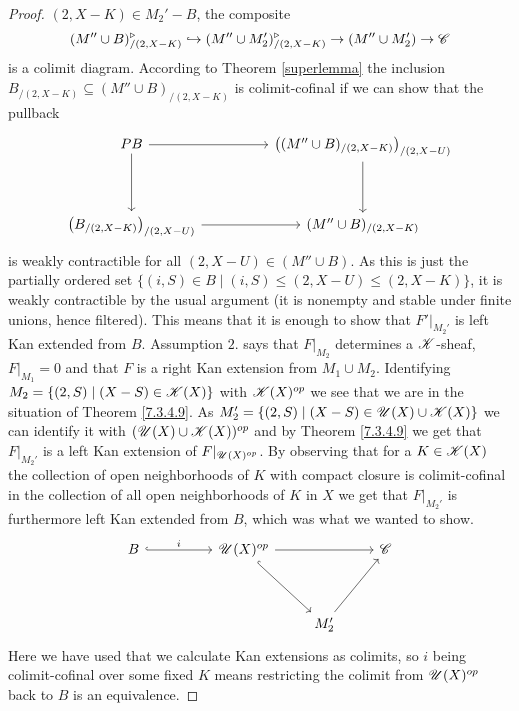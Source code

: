 \documentclass[../../thesis.tex]{subfiles}
\begin{document}
\begin{proof}
    $(2,X-K)\in M_2' - B$, the composite
    \[
        (M'' \cup B)^{\triangleright}_{/(2,X-K)} \hookrightarrow  (M'' \cup M_2')^{\triangleright}_{/(2,X-K)} \to (M''\cup M_2') \to \mathscr{C}
    \]
    is a colimit diagram.
    According to Theorem \ref{superlemma} the inclusion $B_{/(2,X-K)}\subseteq (M''\cup B)_{/(2,X-K)}$ is colimit-cofinal if we can show that the pullback
    \[\begin{tikzcd}
            PB && {\left((M''\cup B)_{/(2,X-K)}\right)_{/(2,X-U)}} \\
            \\
            {\left(B_{/(2,X-K)}\right)_{/(2,X-U)}} && {(M''\cup B)_{/(2,X-K)}}
            \arrow[from=1-1, to=1-3]
            \arrow[from=1-3, to=3-3]
            \arrow[from=3-1, to=3-3]
            \arrow[from=1-1, to=3-1]
        \end{tikzcd}\]
    is weakly contractible for all $(2,X-U) \in (M''\cup B)$.
    As this is just the partially ordered set $\{(i,S)\in B \mid (i,S) \leq (2,X-U) \leq (2,X-K)\}$, it is weakly contractible by the usual argument (it is nonempty and stable under finite unions, hence filtered).
    This means that it is enough to show that $F'|_{M_2'}$ is left Kan extended from $B$.
    Assumption $2.$ says that $F|_{M_2}$ determines a $\mathscr{K}$-sheaf, $F|_{M_1}=0$ and that $F$ is a right Kan extension from $M_1 \cup M_2$.
    Identifying $M_2 = \{(2, S) \mid (X-S) \in \mathscr{K}(X)\}$ with $\mathscr{K}(X)^{op}$ we see that we are in the situation of Theorem \ref{7.3.4.9}.
    As $M_2' = \{(2,S) \mid (X-S) \in \mathscr{U}(X) \cup \mathscr{K}(X)\}$ we can identify it with $(\mathscr{U}(X) \cup \mathscr{K}(X))^{op}$ and by Theorem \ref{7.3.4.9} we get that $F|_{M_2'}$ is a left Kan extension of $F|_{\mathscr{U}(X)^{op}}$.
    By observing that for a $K \in \mathscr{K}(X)$ the collection of open neighborhoods of $K$ with compact closure is colimit-cofinal in the collection of all open neighborhoods of $K$ in $X$ we get that $F|_{M_2'}$ is furthermore left Kan extended from $B$, which was what we wanted to show.
    \[\begin{tikzcd}
            B && {\Open(X)^{op}} && \C \\
            \\
            &&& {M_2'}
            \arrow[hook, from=1-3, to=3-4]
            \arrow[from=1-3, to=1-5]
            \arrow[from=3-4, to=1-5]
            \arrow["i", hook, from=1-1, to=1-3]
        \end{tikzcd}\]
    Here we have used that we calculate Kan extensions as colimits, so $i$ being colimit-cofinal over some fixed $K$ means restricting the colimit from $\mathscr{U}(X)^{op}$ back to $B$ is an equivalence.



\end{proof}
\end{document}
